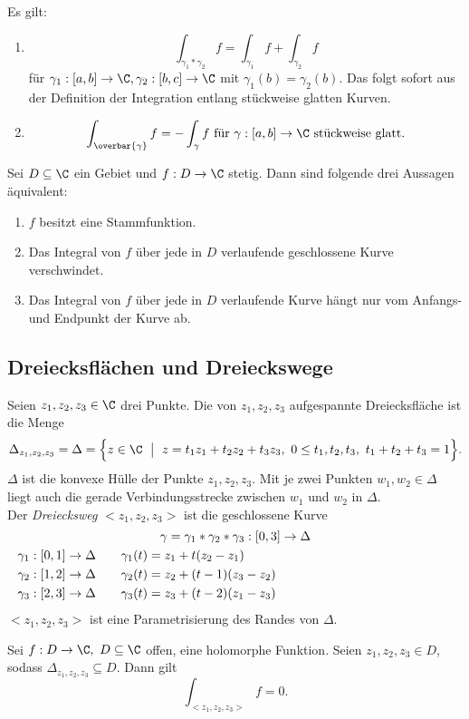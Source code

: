 		Es gilt:
		\begin{enumerate}[label={\roman*})]
			\item $$\int_{\gamma_1 * \gamma_2} f = \int_{\gamma_1} f + \int_{\gamma_2} f $$ für $ \gamma_1: [a,b] \to \C, \gamma_2:[b,c]\to\C $ mit $ \gamma_1(b)=\gamma_2(b) $. Das folgt sofort aus der Definition der Integration entlang stückweise glatten Kurven.
			\item \[ \int_{\overbar{\gamma}} f = -\int_\gamma f\ \text{für $\gamma: [a,b] \to \C$ stückweise glatt.} \]
		\end{enumerate}
		
		\begin{thm}\label{2.2.4}
			Sei $ D \subseteq \C $ ein Gebiet und $ f: D \to \C $ stetig. Dann sind folgende drei Aussagen äquivalent:
			\begin{enumerate}[label={\roman*})]
				\item $f$ besitzt eine Stammfunktion.
				\item Das Integral von $f$ über jede in $D$ verlaufende geschlossene Kurve verschwindet.
				\item Das Integral von $f$ über jede in $D$ verlaufende Kurve hängt nur vom Anfangs- und Endpunkt der Kurve ab.
			\end{enumerate}
		\end{thm}
		
		\subsection*{Dreiecksflächen und Dreieckswege}
		Seien $ z_1,z_2,z_3 \in \C $ drei Punkte. Die von $ z_1,z_2,z_3 $ aufgespannte Dreiecksfläche ist die Menge
		\[ \Delta_{z_1,z_2,z_3} = \Delta = \Bigl\{ z \in \C \ \bigm|\ z = t_1z_1 + t_2z_2 + t_3z_3,\ 0 \leq t_1,t_2,t_3,\ t_1+t_2+t_3 = 1 \Bigr\}. \]
		$\Delta$ ist die konvexe Hülle der Punkte $ z_1,z_2,z_3 $. Mit je zwei Punkten $ w_1,w_2 \in \Delta $ liegt auch die gerade Verbindungsstrecke zwischen $w_1$ und $w_2$ in $\Delta$.\\
		Der \emph{Dreiecksweg} $ <z_1,z_2,z_3> $ ist die geschlossene Kurve
		\begin{align*}
			\noalign{\centering $\gamma = \gamma_1 * \gamma_2 * \gamma_3: [0,3] \to \Delta$}
			\gamma_1 &: [0,1] \to \Delta \qquad \gamma_1 (t) = z_1 + t(z_2-z_1)\\
			\gamma_2 &: [1,2] \to \Delta \qquad \gamma_2 (t) = z_2 + (t-1)(z_3-z_2)\\
			\gamma_3 &: [2,3] \to \Delta \qquad \gamma_3 (t) = z_3 + (t-2)(z_1 - z_3)
		\end{align*}
		$ <z_1,z_2,z_3> $ ist eine Parametrisierung des Randes von $\Delta$.
			
		\begin{thmn}
			Sei $ f: D \to \C,\ D \subseteq \C $ offen, eine holomorphe Funktion. Seien $z_1,z_2,z_3 \in D$, sodass $ \Delta_{z_1,z_2,z_3} \subseteq D $. Dann gilt
			\[ \int_{<z_1,z_2,z_3>} f = 0. \]
		\end{thmn}